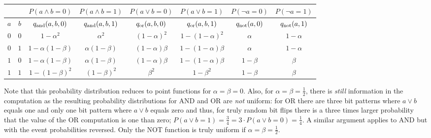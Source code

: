 \begin{center}
    \begin{tabular}{c|c||c|c||c|c||c|c}
        \multicolumn{2}{c||}{}         &
        $P\left(a \land b = 0\right)$  & $P\left(a \land b = 1\right)$  &
        $P\left(a \lor b = 0\right)$   & $P\left(a \lor b = 1\right)$   &
        $P\left(\neg a = 0\right)$     & $P\left(\neg a = 1\right)$       \\
        \hline
        $a$                            & $b$                            &
        $q_{\mathrm{and}}(a,b,0)$                & $q_{\mathrm{and}}(a,b,1)$                &
        $q_{\mathrm{or}}(a,b,0) $                & $q_{\mathrm{or}}(a,b,1)$                 &
        $q_{\mathrm{not}}(a,0)$                  & $q_{\mathrm{not}}(a,1)$                    \\
        \hline
        $0$                            & $0$                            &
        $1-\alpha^2$                   & $\alpha^2$                     &
        $\left(1-\alpha\right)^2$      & $1-\left(1-\alpha\right)^2$    &
        $\alpha$                       & $1-\alpha$                       \\
        $0$                            & $1$                            &
        $1-\alpha\left(1-\beta\right)$ & $\alpha\left(1-\beta\right)$   &
        $\left(1-\alpha\right)\beta$   & $1-\left(1-\alpha\right)\beta$ &
        $\alpha$                       & $1-\alpha$                       \\
        $1$                            & $0$                            &
        $1-\alpha\left(1-\beta\right)$ & $\alpha\left(1-\beta\right)$   &
        $\left(1-\alpha\right)\beta$   & $1-\left(1-\alpha\right)\beta$ &
        $1-\beta$                      & $\beta$                          \\
        $1$                            & $1$                            &
        $1-\left(1-\beta\right)^2$     & $\left(1-\beta\right)^2$       &
        $\beta^2$                      & $1-\beta^2$                    &
        $1-\beta$                      & $\beta$                          \\
    \end{tabular}
\end{center}

Note that this probability distribution reduces to point functions for $\alpha = \beta = 0$. Also, for $\alpha = \beta = \frac{1}{2}$, there is {\em still} information in the computation as the resulting probability distributions for AND and OR are {\em not} uniform: for OR there are three bit patterns where $a \lor b$ equals one and only one bit pattern where $a \lor b$ equals zero and thus, for truly random bit flips there is a three times larger probability that the value of the OR computation is one than zero; $P(a \lor b = 1)=\frac{3}{4}=3\cdot P(a \lor b = 0)=\frac{1}{4}$. A similar argument applies to AND but with the event probabilities reversed. Only the NOT function is truly uniform if $\alpha = \beta = \frac{1}{2}$.

